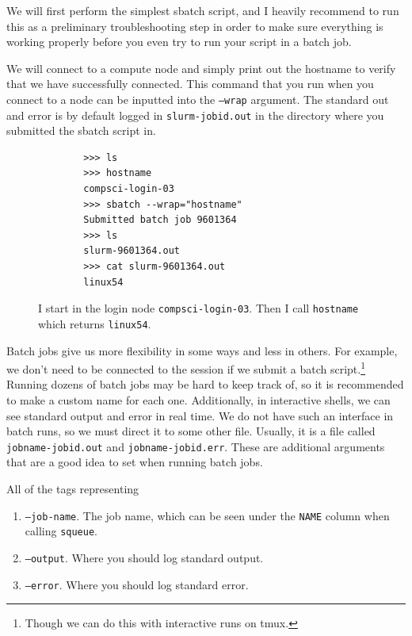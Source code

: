   We will first perform the simplest sbatch script, and I heavily recommend to run this as a preliminary troubleshooting step in order to make sure everything is working properly before you even try to run your script in a batch job.

  \begin{theorem}
    \label{thm:batch-job-to-print-hostname}
    We will connect to a compute node and simply print out the hostname to verify that we have successfully connected. This command that you run when you connect to a node can be inputted into the \texttt{--wrap} argument. The standard out and error is by default logged in \texttt{slurm-jobid.out} in the directory where you submitted the sbatch script in. 

    \begin{figure}[H]
      \centering 
      \begin{lstlisting}
        >>> ls
        >>> hostname                
        compsci-login-03
        >>> sbatch --wrap="hostname"
        Submitted batch job 9601364
        >>> ls
        slurm-9601364.out
        >>> cat slurm-9601364.out 
        linux54 
      \end{lstlisting}
      \caption{I start in the login node \texttt{compsci-login-03}. Then I call \texttt{hostname} which returns \texttt{linux54}.}
    \end{figure} 
  \end{theorem}

  Batch jobs give us more flexibility in some ways and less in others. For example, we don't need to be connected to the session if we submit a batch script.\footnote{Though we can do this with interactive runs on tmux.} Running dozens of batch jobs may be hard to keep track of, so it is recommended to make a custom name for each one. Additionally, in interactive shells, we can see standard output and error in real time. We do not have such an interface in batch runs, so we must direct it to some other file. Usually, it is a file called \texttt{jobname-jobid.out} and \texttt{jobname-jobid.err}. These are additional arguments that are a good idea to set when running batch jobs. 

  \begin{definition}
    \label{def:naming-and-logging-options}
    All of the tags representing 
    \begin{enumerate}
      \item \texttt{--job-name}. The job name, which can be seen under the \texttt{NAME} column when calling \texttt{squeue}. 
      \item \texttt{--output}. Where you should log standard output. 
      \item \texttt{--error}. Where you should log standard error. 
    \end{enumerate}
  \end{definition}

